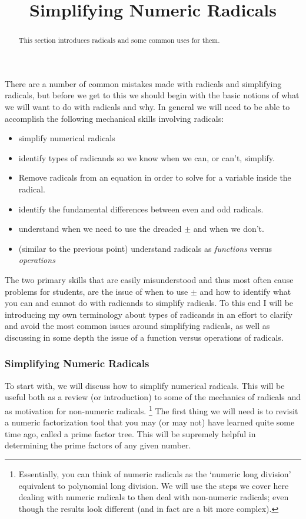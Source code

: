 \documentclass{ximeraXloud}
\title{Simplifying Numeric Radicals}
\begin{document}
\begin{abstract}
    This section introduces radicals and some common uses for them.
\end{abstract}
\maketitle

There are a number of common mistakes made with radicals and simplifying radicals, but before we get to this we should begin with the basic notions of what we will want to do with radicals and why. In general we will need to be able to accomplish the following mechanical skills involving radicals:
\begin{itemize}
    \item simplify numerical radicals
    \item identify types of radicands so we know when we can, or can't, simplify.
    \item Remove radicals from an equation in order to solve for a variable inside the radical.
    \item identify the fundamental differences between even and odd radicals.
    \item understand when we need to use the dreaded $\pm$ and when we don't.
    \item (similar to the previous point) understand radicals as \textit{functions} versus \textit{operations}
\end{itemize}

The two primary skills that are easily misunderstood and thus most often cause problems for students, are the issue of when to use $\pm$ and how to identify what you can and cannot do with radicands to simplify radicals. To this end I will be introducing my own terminology about types of radicands in an effort to clarify and avoid the most common issues around simplifying radicals, as well as discussing in some depth the issue of a function versus operations of radicals.

\subsubsection*{Simplifying Numeric Radicals}
    To start with, we will discuss how to simplify numerical radicals. This will be useful both as a review (or introduction) to some of the mechanics of radicals and as motivation for non-numeric radicals.%
    \footnote{%
        Essentially, you can think of numeric radicals as the `numeric long division' equivalent to polynomial long division. We will use the steps we cover here dealing with numeric radicals to then deal with non-numeric radicals; even though the results look different (and in fact are a bit more complex).%
        }
    The first thing we will need is to revisit a numeric factorization tool that you may (or may not) have learned quite some time ago, called a prime factor tree. This will be supremely helpful in determining the prime factors of any given number.
\end{document}
